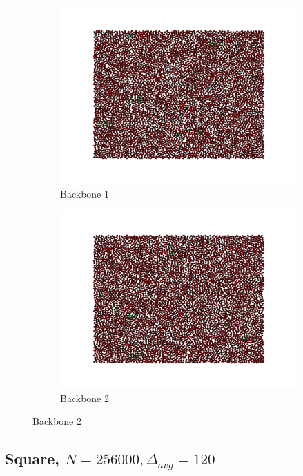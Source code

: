 \documentclass[oneside, titlepage]{scrartcl}
\begin{document}
\begin{figure}[!h]
\begin{subfigure}{0.5\textwidth}
	\centering
	\includegraphics[width=0.9\linewidth]{figures/simplegraph40.pdf}
	\caption{Backbone 1}
\end{subfigure}%
\begin{subfigure}{0.5\textwidth}
	\centering
	\includegraphics[width=0.9\linewidth]{figures/simplegraph401.pdf}
	\caption{Backbone 2}
\end{subfigure}
\end{figure}


\subsection{Square, $N=256000, \Delta_{avg}=120$}
\end{document}
